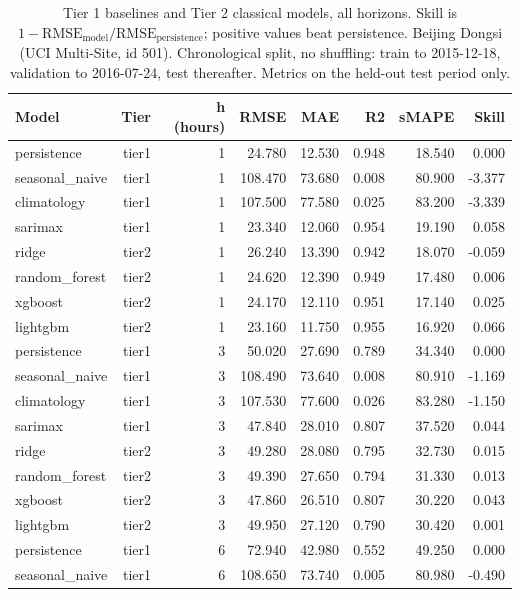\begin{table}[htbp]
\caption{Tier 1 baselines and Tier 2 classical models, all horizons. Skill is $1 - \mathrm{RMSE}_{\mathrm{model}}/\mathrm{RMSE}_{\mathrm{persistence}}$; positive values beat persistence. Beijing Dongsi (UCI Multi-Site, id 501). Chronological split, no shuffling: train to 2015-12-18, validation to 2016-07-24, test thereafter. Metrics on the held-out test period only.}
\label{tab:tier1_tier2_all_horizons}
\begin{tabular}{lrrrrrrr}
\toprule
Model & Tier & h (hours) & RMSE & MAE & R2 & sMAPE & Skill \\
\midrule
persistence & tier1 & 1 & 24.780 & 12.530 & 0.948 & 18.540 & 0.000 \\
seasonal\_naive & tier1 & 1 & 108.470 & 73.680 & 0.008 & 80.900 & -3.377 \\
climatology & tier1 & 1 & 107.500 & 77.580 & 0.025 & 83.200 & -3.339 \\
sarimax & tier1 & 1 & 23.340 & 12.060 & 0.954 & 19.190 & 0.058 \\
ridge & tier2 & 1 & 26.240 & 13.390 & 0.942 & 18.070 & -0.059 \\
random\_forest & tier2 & 1 & 24.620 & 12.390 & 0.949 & 17.480 & 0.006 \\
xgboost & tier2 & 1 & 24.170 & 12.110 & 0.951 & 17.140 & 0.025 \\
lightgbm & tier2 & 1 & 23.160 & 11.750 & 0.955 & 16.920 & 0.066 \\
persistence & tier1 & 3 & 50.020 & 27.690 & 0.789 & 34.340 & 0.000 \\
seasonal\_naive & tier1 & 3 & 108.490 & 73.640 & 0.008 & 80.910 & -1.169 \\
climatology & tier1 & 3 & 107.530 & 77.600 & 0.026 & 83.280 & -1.150 \\
sarimax & tier1 & 3 & 47.840 & 28.010 & 0.807 & 37.520 & 0.044 \\
ridge & tier2 & 3 & 49.280 & 28.080 & 0.795 & 32.730 & 0.015 \\
random\_forest & tier2 & 3 & 49.390 & 27.650 & 0.794 & 31.330 & 0.013 \\
xgboost & tier2 & 3 & 47.860 & 26.510 & 0.807 & 30.220 & 0.043 \\
lightgbm & tier2 & 3 & 49.950 & 27.120 & 0.790 & 30.420 & 0.001 \\
persistence & tier1 & 6 & 72.940 & 42.980 & 0.552 & 49.250 & 0.000 \\
seasonal\_naive & tier1 & 6 & 108.650 & 73.740 & 0.005 & 80.980 & -0.490 \\

\end{tabular}
\end{table}
